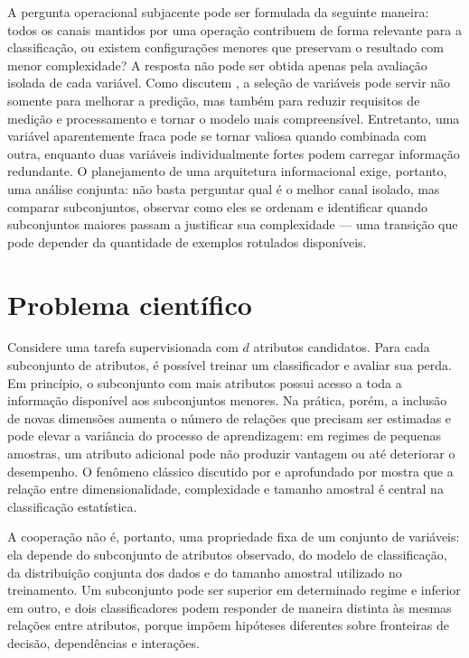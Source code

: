 A pergunta operacional subjacente pode ser formulada da seguinte maneira: todos os canais mantidos por uma operação contribuem de forma relevante para a classificação, ou existem configurações menores que preservam o resultado com menor complexidade? A resposta não pode ser obtida apenas pela avaliação isolada de cada variável. Como discutem \textcite{guyon2003}, a seleção de variáveis pode servir não somente para melhorar a predição, mas também para reduzir requisitos de medição e processamento e tornar o modelo mais compreensível. Entretanto, uma variável aparentemente fraca pode se tornar valiosa quando combinada com outra, enquanto duas variáveis individualmente fortes podem carregar informação redundante. O planejamento de uma arquitetura informacional exige, portanto, uma análise conjunta: não basta perguntar qual é o melhor canal isolado, mas comparar subconjuntos, observar como eles se ordenam e identificar quando subconjuntos maiores passam a justificar sua complexidade --- uma transição que pode depender da quantidade de exemplos rotulados disponíveis.

\section{Problema científico}

Considere uma tarefa supervisionada com $d$ atributos candidatos. Para cada subconjunto de atributos, é possível treinar um classificador e avaliar sua perda. Em princípio, o subconjunto com mais atributos possui acesso a toda a informação disponível aos subconjuntos menores. Na prática, porém, a inclusão de novas dimensões aumenta o número de relações que precisam ser estimadas e pode elevar a variância do processo de aprendizagem: em regimes de pequenas amostras, um atributo adicional pode não produzir vantagem ou até deteriorar o desempenho. O fenômeno clássico discutido por \textcite{hughes1968} e aprofundado por \textcite{raudys1991} mostra que a relação entre dimensionalidade, complexidade e tamanho amostral é central na classificação estatística.

A cooperação não é, portanto, uma propriedade fixa de um conjunto de variáveis: ela depende do subconjunto de atributos observado, do modelo de classificação, da distribuição conjunta dos dados e do tamanho amostral utilizado no treinamento. Um subconjunto pode ser superior em determinado regime e inferior em outro, e dois classificadores podem responder de maneira distinta às mesmas relações entre atributos, porque impõem hipóteses diferentes sobre fronteiras de decisão, dependências e interações.

